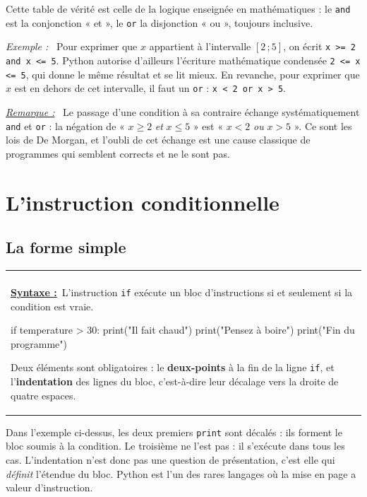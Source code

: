 \documentclass[a4paper,11pt,openany]{book}
\makeatletter
\newcommand{\code}[1]{\texttt{\textcolor{codebleu}{#1}}}
\newenvironment{cadre}%
 {\par\vspace{2mm}\noindent\begin{tabular}{|@{\hspace{4mm}}p{0.93\textwidth}@{\hspace{4mm}}|}
  \hline \\[-2mm]}%
 {\\[2mm] \hline \end{tabular}\par\vspace{3mm}}
\newcommand{\syntaxe}{\textbf{\underline{Syntaxe :}}~}
\newenvironment{exemple}%
 {\par\vspace{1mm}\begin{list}{}{\leftmargin=1cm \rightmargin=0.5cm}\item[]%
  \textit{Exemple :}~}%
 {\end{list}\vspace{1mm}}
\newenvironment{remarque}%
 {\par\vspace{1mm}\begin{list}{}{\leftmargin=1cm \rightmargin=0.5cm}\item[]%
  \textit{\underline{Remarque :}}~}%
 {\end{list}\vspace{1mm}}
\makeatother
\begin{document}
Cette table de vérité est celle de la logique enseignée en mathématiques : le \code{and} est la conjonction « et », le \code{or} la disjonction « ou », toujours inclusive.

\begin{exemple}
Pour exprimer que $x$ appartient à l'intervalle $[2\,;5]$, on écrit \code{x >= 2 and x <= 5}. Python autorise d'ailleurs l'écriture mathématique condensée \code{2 <= x <= 5}, qui donne le même résultat et se lit mieux. En revanche, pour exprimer que $x$ est en dehors de cet intervalle, il faut un \code{or} : \code{x < 2 or x > 5}.
\end{exemple}

\begin{remarque}
Le passage d'une condition à sa contraire échange systématiquement \code{and} et \code{or} : la négation de « $x \geqslant 2$ \emph{et} $x \leqslant 5$ » est « $x < 2$ \emph{ou} $x > 5$ ». Ce sont les lois de De Morgan, et l'oubli de cet échange est une cause classique de programmes qui semblent corrects et ne le sont pas.
\end{remarque}

\section{L'instruction conditionnelle}

\subsection{La forme simple}

\begin{cadre}
\syntaxe L'instruction \code{if} exécute un bloc d'instructions si et seulement si la condition est vraie.
\begin{python}
if temperature > 30:
    print("Il fait chaud")
    print("Pensez à boire")
print("Fin du programme")
\end{python}
Deux éléments sont obligatoires : le \textbf{deux-points} à la fin de la ligne \code{if}, et l'\textbf{indentation} des lignes du bloc, c'est-à-dire leur décalage vers la droite de quatre espaces.
\end{cadre}

Dans l'exemple ci-dessus, les deux premiers \code{print} sont décalés : ils forment le bloc soumis à la condition. Le troisième ne l'est pas : il s'exécute dans tous les cas. L'indentation n'est donc pas une question de présentation, c'est elle qui \emph{définit} l'étendue du bloc. Python est l'un des rares langages où la mise en page a valeur d'instruction.
\end{document}
